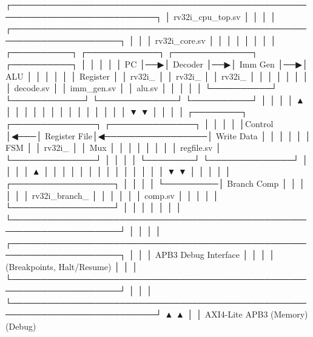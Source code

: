 \begin{record}

\begin{textblock}
┌──────────────────────────────────────────────────────────────────────────┐
│                         rv32i_cpu_top.sv                                 │
│                                                                          │
│  ┌────────────────────────────────────────────────────────────────────┐ │
│  │                      rv32i_core.sv                                 │ │
│  │                                                                    │ │
│  │  ┌──────────┐   ┌────────────┐   ┌─────────────┐   ┌──────────┐  │ │
│  │  │    PC    │──▶│  Decoder   │──▶│  Imm Gen    │──▶│   ALU    │  │ │
│  │  │ Register │   │ rv32i_     │   │ rv32i_      │   │ rv32i_   │  │ │
│  │  │          │   │ decode.sv  │   │ imm_gen.sv  │   │ alu.sv   │  │ │
│  │  └──────────┘   └────────────┘   └─────────────┘   └──────────┘  │ │
│  │       ▲              │                                   │         │ │
│  │       │              │                                   │         │ │
│  │       │              ▼                                   ▼         │ │
│  │  ┌────────┐    ┌──────────────┐                  ┌──────────────┐ │ │
│  │  │Control │◀───│ Register File│◀─────────────────│ Write Data   │ │ │
│  │  │  FSM   │    │   rv32i_     │                  │     Mux      │ │ │
│  │  │        │    │ regfile.sv   │                  └──────────────┘ │ │
│  │  └────────┘    └──────────────┘                                   │ │
│  │       ▲              │     │                                       │ │
│  │       │              │     │                                       │ │
│  │       │              ▼     ▼                                       │ │
│  │       │         ┌─────────────────┐                               │ │
│  │       └─────────│  Branch Comp    │                               │ │
│  │                 │  rv32i_branch_  │                               │ │
│  │                 │  comp.sv        │                               │ │
│  │                 └─────────────────┘                               │ │
│  │                                                                    │ │
│  └────────────────────────────────────────────────────────────────────┘ │
│                                                                          │
│  ┌────────────────────────────────────────────────────────────────────┐ │
│  │                    APB3 Debug Interface                            │ │
│  │                  (Breakpoints, Halt/Resume)                        │ │
│  └────────────────────────────────────────────────────────────────────┘ │
│                                                                          │
└──────────────────────────────────────────────────────────────────────────┘
     ▲                                                          ▲
     │                                                          │
 AXI4-Lite                                                   APB3
 (Memory)                                                  (Debug)
\end{textblock}

\end{record}


